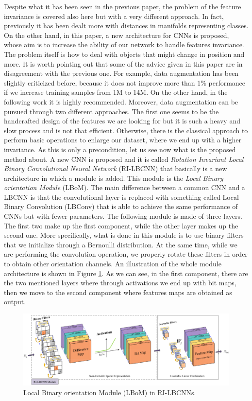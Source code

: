 Despite what it has been seen in the previous paper, the problem of the feature invariance is covered also here but with a very different approach. In fact, previously it has been dealt more with distances in manifolds representing classes. On the other hand, in this paper, a new architecture for CNNs is proposed, whose aim is to increase the ability of our network to handle features invariance. The problem itself is how to deal with objects that might change in position and more. It is worth pointing out that some of the advice given in this paper are in disagreement with the previous one. For example, data augmentation has been slightly criticized before, because it does not improve more than 1\% performance if we increase training samples from 1M to 14M. On the other hand, in the following work it is highly recommended. Moreover, data augmentation can be pursued through two different approaches. The first one seems to be the handcrafted design of the features we are looking for but it is such a heavy and slow process and is not that efficient. Otherwise, there is the classical approach to perform basic operations to enlarge our dataset, where we end up with a higher invariance. As this is only a precondition, let us see now what is the proposed method about. A new CNN is proposed and it is called \textit{Rotation Invariant Local Binary Convolutional Neural Network} (RI-LBCNN) that basically is a new architecture in which a module is added. This module is the \textit{Local Binary orientation Module} (LBoM). The main difference between a common CNN and a LBCNN is that the convolutional layer is replaced with something called Local Binary Convolution (LBConv) that is able to achieve the same performance of CNNs but with fewer parameters. The following module is made of three layers. The first two make up the first component, while the other layer makes up the second one. More specifically, what is done in this module is to use binary filters that we initialize through a Bernoulli distribution. At the same time, while we are performing the convolution operation, we properly rotate these filters in order to obtain other orientation channels. An illustration of the whole module architecture is shown in Figure \ref{fig:05_1}. As we can see, in the first component, there are the two mentioned layers where through activations we end up with bit maps, then we move to the second component where features maps are obtained as output.\\

\begin{figure}[h!]
    \centering
    \includegraphics[scale=0.45]{images/05_1.png}
    \caption{Local Binary orientation Module (LBoM) in RI-LBCNNs.}
    \label{fig:05_1}
\end{figure}

